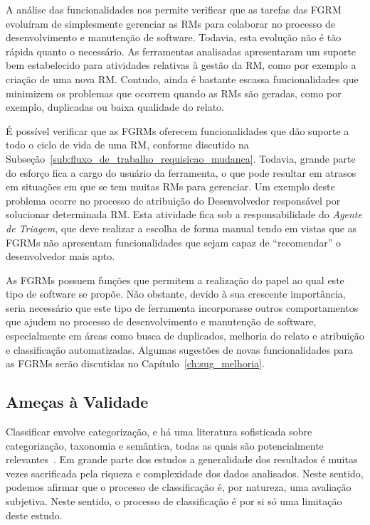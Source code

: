 A análise das funcionalidades nos permite verificar que as tarefas das FGRM
evoluíram de simplesmente gerenciar as RMs para colaborar no processo de
desenvolvimento e manutenção de software. Todavia, esta evolução não é tão
rápida quanto o necessário. As ferramentas analisadas apresentaram um suporte
bem estabelecido para atividades relativas à gestão da RM, como por exemplo a
criação de uma nova RM\@. Contudo, ainda é bastante escassa funcionalidades que
minimizem os problemas que ocorrem quando as RMs são geradas, como por exemplo,
duplicadas ou baixa qualidade do relato.

É possível verificar que as FGRMs oferecem funcionalidades que dão suporte a
todo o ciclo de vida de uma RM, conforme discutido na
Subseção~\ref{sub:fluxo_de_trabalho_requisicao_mudanca}. Todavia, grande parte
do esforço fica a cargo do usuário da ferramenta, o que pode resultar em atrasos
em situações em que se tem muitas RMs para gerenciar. Um exemplo deste problema
ocorre no processo de atribuição do Desenvolvedor responsável por solucionar
determinada RM\@. Esta atividade fica sob a responsabilidade do \textit{Agente
    de Triagem}, que deve realizar a escolha de forma manual tendo em vistas que
as FGRMs não apresentam funcionalidades que sejam capaz de ``recomendar'' o
desenvolvedor mais apto.

As FGRMs possuem funções que permitem a realização do papel ao qual este tipo de
software se propõe. Não obstante, devido à sua crescente importância, seria
necessário que este tipo de ferramenta incorporasse outros comportamentos que
ajudem no processo de desenvolvimento e manutenção de software, especialmente em
áreas como busca de duplicados, melhoria do relato e atribuição e classificação
automatizadas. Algumas sugestões de novas funcionalidades para as FGRMs serão
discutidas no Capítulo~\ref{ch:sug_melhoria}.

\subsection{Ameças à Validade}
\label{sec:ameacas_a_validade}

Classificar envolve categorização, e há uma literatura sofisticada sobre
categorização, taxonomia e semântica, todas as quais são potencialmente
relevantes~\cite{rugg2005sorting}. Em grande parte dos estudos a generalidade
dos resultados é muitas vezes sacrificada pela riqueza e complexidade dos dados
analisados. Neste sentido, podemos afirmar que o processo de classificação é,
por natureza, uma avaliação subjetiva. Neste sentido, o processo de
classificação é por si só uma limitação deste estudo.


